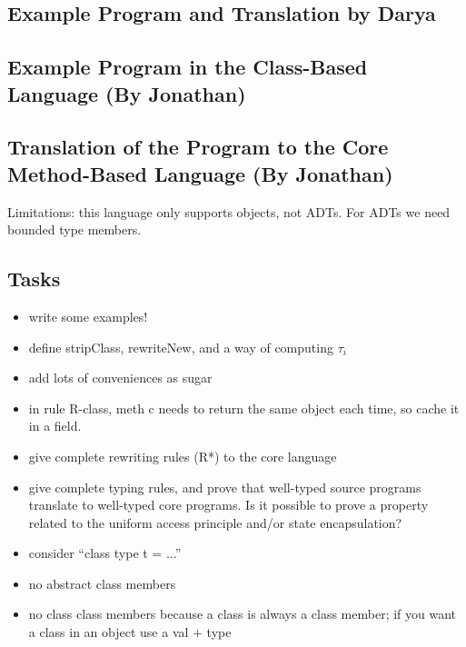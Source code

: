 


\clearpage


\subsection{Example Program and Translation by Darya}





\clearpage


\subsection{Example Program in the Class-Based Language (By Jonathan)}



\subsection{Translation of the Program to the Core Method-Based
  Language (By Jonathan)}



Limitations: this language only supports objects, not ADTs.  For ADTs we need bounded type members.


\clearpage


\subsection{Tasks}

\begin{itemize}

 \item write some examples!
 \item define stripClass, rewriteNew, and a way of computing $\tau_i$
 \item add lots of conveniences as sugar
 \item in rule R-class, meth c needs to return the same object each time, so cache it in a field.
 \item give complete rewriting rules (R*) to the core language
 \item give complete typing rules, and prove that well-typed source programs translate to well-typed core programs.  Is it possible to prove a property related to the uniform access principle and/or state encapsulation?
 \item consider ``class type t = ...''
 \item no abstract class members
 \item no class class members because a class is always a class member; if you want a class in an object use a val $+$ type 

\end{itemize}
